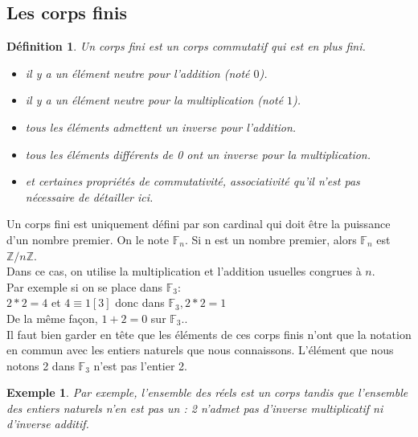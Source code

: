 \documentclass[a4paper]{article}
\newtheorem{Ex}{Exemple}[subsection]
\newtheorem{Def}{Définition}[section]
\begin{document}
\subsection{Les corps finis}
\begin{Def}
  Un corps fini est un corps commutatif qui est en plus fini.\\
  \begin{itemize}
\item il y a un élément neutre pour l'addition (noté $0$).
\item il y a un élément neutre pour la multiplication (noté $1$).
\item tous les éléments admettent un inverse pour l'addition.
\item tous les éléments différents de 0 ont un inverse pour la multiplication.
\item et certaines propriétés de commutativité, associativité qu'il n'est pas nécessaire de détailler ici.
  \end{itemize}
  \end{Def}
Un corps fini est uniquement défini par son cardinal qui doit être la puissance d'un nombre premier. On le note $\mathbb{F}_n$.
  Si n est un nombre premier, alors $\mathbb{F}_n$ est $\mathbb{Z}/n\mathbb{Z}$.\vspace{1\baselineskip}\\
  Dans ce cas, on utilise la multiplication et l'addition usuelles congrues à $n$. \\Par exemple si on se place dans $\mathbb{F}_3$:\\
  $2*2=4$ et $4 \equiv 1 [3]$ donc dans $\mathbb{F}_3,2*2=1$\\
  De la même façon, $1+2=0$ sur $\mathbb{F}_3$.\vspace{1\baselineskip}.\\

  Il faut bien garder en tête que les éléments de ces corps finis n'ont que la notation en commun avec les entiers naturels que nous connaissons. L'élément que nous notons 2 dans $\mathbb{F}_3$ n'est pas l'entier 2.

\begin{Ex}
  Par exemple, l'ensemble des réels est un corps tandis que l'ensemble des entiers naturels n'en est pas un : 2 n'admet pas d'inverse multiplicatif ni d'inverse additif.
  \end{Ex}
  
\end{document}
